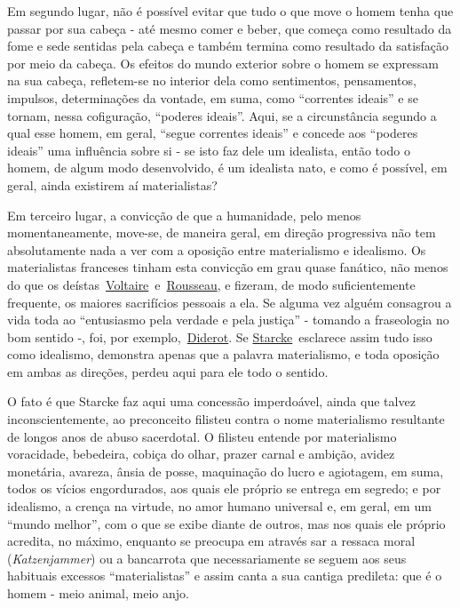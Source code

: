 Em segundo lugar, não é possível evitar que tudo o que move o homem
tenha que passar por sua cabeça - até mesmo comer e beber, que começa
como resultado da fome e sede sentidas pela cabeça e também termina como
resultado da satisfação por meio da cabeça. Os efeitos do mundo exterior
sobre o homem se expressam na sua cabeça, refletem-se no interior dela
como sentimentos, pensamentos, impulsos, determinações da vontade, em
suma, como ``correntes ideais'' e se tornam, nessa cofiguração,
``poderes ideais''. Aqui, se a circunstância segundo a qual esse homem,
em geral, ``segue correntes ideais'' e concede aos ``poderes ideais''
uma influência sobre si - se isto faz dele um idealista, então todo o
homem, de algum modo desenvolvido, é um idealista nato, e como é
possível, em geral, ainda existirem aí materialistas?

Em terceiro lugar, a convicção de que a humanidade, pelo menos
momentaneamente, move-se, de maneira geral, em direção progressiva não
tem absolutamente nada a ver com a oposição entre materialismo e
idealismo. Os materialistas franceses tinham esta convicção em grau
quase fanático, não menos do que os
deístas\protect\hypertarget{n81}{}{}~\href{https://www.marxists.org/portugues/dicionario/verbetes/v/voltaire.htm}{Voltaire}~e~\href{https://www.marxists.org/portugues/dicionario/verbetes/r/rousseau.htm}{Rousseau},
e fizeram, de modo suficientemente frequente, os maiores sacrifícios
pessoais a ela. Se alguma vez alguém consagrou a vida toda ao
``entusiasmo pela verdade e pela justiça'' - tomando a fraseologia no
bom sentido -, foi, por
exemplo,~\href{https://www.marxists.org/portugues/dicionario/verbetes/d/diderot_denis.htm}{Diderot}.
Se
\href{https://www.marxists.org/portugues/dicionario/verbetes/s/starcke_carl.htm}{Starcke}~esclarece
assim tudo isso como idealismo, demonstra apenas que a palavra
materialismo, e toda oposição em ambas as direções, perdeu aqui para ele
todo o sentido.

O fato é que Starcke faz aqui uma concessão imperdoável, ainda que
talvez inconscientemente, ao preconceito filisteu contra o nome
materialismo resultante de longos anos de abuso sacerdotal. O filisteu
entende por materialismo voracidade, bebedeira, cobiça do olhar, prazer
carnal e ambição, avidez monetária, avareza, ânsia de posse, maquinação
do lucro e agiotagem, em suma, todos os vícios engordurados, aos quais
ele próprio se entrega em segredo; e por idealismo, a crença na virtude,
no amor humano universal e, em geral, em um ``mundo melhor'', com o que
se exibe diante de outros, mas nos quais ele próprio acredita, no
máximo, enquanto se preocupa em através sar a ressaca moral
(\emph{Katzenjammer}) ou a bancarrota que necessariamente se seguem aos
seus habituais excessos ``materialistas'' e assim canta a sua cantiga
predileta: que é o homem - meio animal, meio anjo.

